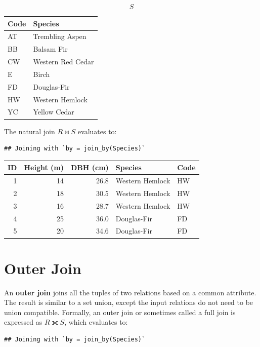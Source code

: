 \documentclass[
]{book}
\begin{document}
\[S\]

\begin{tabular}{ll}
\toprule
Code & Species\\
\midrule
AT & Trembling Aspen\\
BB & Balsam Fir\\
CW & Western Red Cedar\\
E & Birch\\
FD & Douglas-Fir\\
\addlinespace
HW & Western Hemlock\\
YC & Yellow Cedar\\
\bottomrule
\end{tabular}

The natural join \(R⋈S\) evaluates to:

\begin{verbatim}
## Joining with `by = join_by(Species)`
\end{verbatim}

\begin{tabular}{rrrll}
\toprule
ID & Height (m) & DBH (cm) & Species & Code\\
\midrule
1 & 14 & 26.8 & Western Hemlock & HW\\
2 & 18 & 30.5 & Western Hemlock & HW\\
3 & 16 & 28.7 & Western Hemlock & HW\\
4 & 25 & 36.0 & Douglas-Fir & FD\\
5 & 20 & 34.6 & Douglas-Fir & FD\\
\bottomrule
\end{tabular}

\hypertarget{outer-join}{%
\section{Outer Join}\label{outer-join}}

An \textbf{outer join} joins all the tuples of two relations based on a common attribute. The result is similar to a set union, except the input relations do not need to be union compatible. Formally, an outer join or sometimes called a full join is expressed as \(R⟗S\), which evaluates to:

\begin{verbatim}
## Joining with `by = join_by(Species)`
\end{verbatim}
\end{document}
